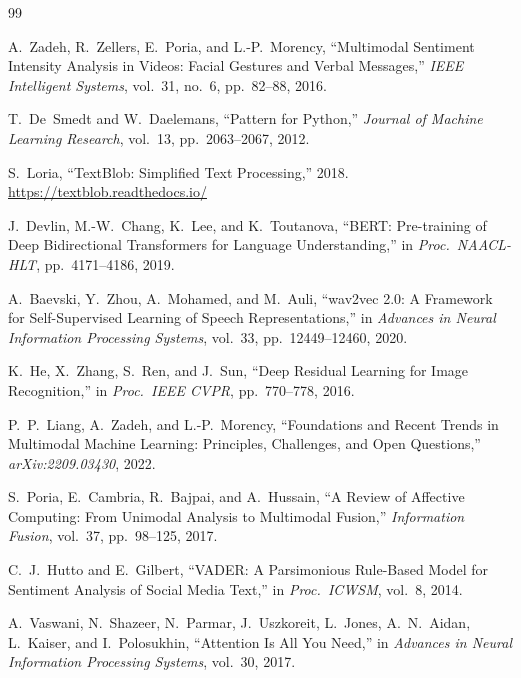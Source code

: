 \documentclass[12pt,a4paper]{article}
\theoremstyle{plain}
\theoremstyle{definition}
\begin{document}
\begin{thebibliography}{99}

A.~Zadeh, R.~Zellers, E.~Poria, and L.-P.~Morency,
``Multimodal Sentiment Intensity Analysis in Videos:
  Facial Gestures and Verbal Messages,''
\textit{IEEE Intelligent Systems}, vol.~31, no.~6, pp.~82--88, 2016.

T.~De~Smedt and W.~Daelemans,
``Pattern for Python,''
\textit{Journal of Machine Learning Research},
vol.~13, pp.~2063--2067, 2012.

S.~Loria,
``TextBlob: Simplified Text Processing,''
2018. \url{https://textblob.readthedocs.io/}

J.~Devlin, M.-W.~Chang, K.~Lee, and K.~Toutanova,
``BERT: Pre-training of Deep Bidirectional Transformers for
  Language Understanding,''
in \textit{Proc.\ NAACL-HLT}, pp.~4171--4186, 2019.

A.~Baevski, Y.~Zhou, A.~Mohamed, and M.~Auli,
``wav2vec 2.0: A Framework for Self-Supervised Learning of
  Speech Representations,''
in \textit{Advances in Neural Information Processing Systems},
vol.~33, pp.~12449--12460, 2020.

K.~He, X.~Zhang, S.~Ren, and J.~Sun,
``Deep Residual Learning for Image Recognition,''
in \textit{Proc.\ IEEE CVPR}, pp.~770--778, 2016.

P.~P.~Liang, A.~Zadeh, and L.-P.~Morency,
``Foundations and Recent Trends in Multimodal Machine Learning:
  Principles, Challenges, and Open Questions,''
\textit{arXiv:2209.03430}, 2022.

S.~Poria, E.~Cambria, R.~Bajpai, and A.~Hussain,
``A Review of Affective Computing: From Unimodal Analysis to
  Multimodal Fusion,''
\textit{Information Fusion}, vol.~37, pp.~98--125, 2017.

C.~J.~Hutto and E.~Gilbert,
``VADER: A Parsimonious Rule-Based Model for Sentiment Analysis
  of Social Media Text,''
in \textit{Proc.\ ICWSM}, vol.~8, 2014.

A.~Vaswani, N.~Shazeer, N.~Parmar, J.~Uszkoreit, L.~Jones,
A.~N.~Aidan, L.~Kaiser, and I.~Polosukhin,
``Attention Is All You Need,''
in \textit{Advances in Neural Information Processing Systems},
vol.~30, 2017.

\end{thebibliography}
\end{document}
